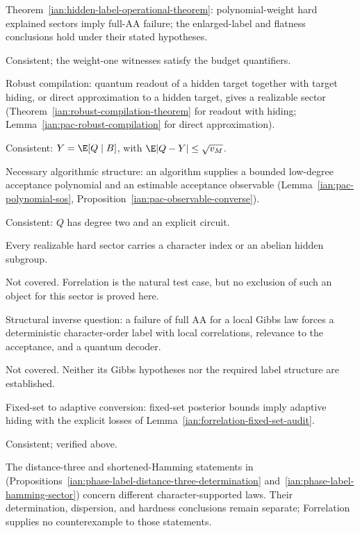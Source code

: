 \begin{remark}
\noindent
\parbox[t]{.70\linewidth}{Theorem~\ref{ian:hidden-label-operational-theorem}: polynomial-weight hard explained sectors imply full-AA failure; the enlarged-label and flatness conclusions hold under their stated hypotheses.}
\hfill
\parbox[t]{.26\linewidth}{Consistent; the weight-one witnesses satisfy the budget quantifiers.}
\par\smallskip

\noindent
\parbox[t]{.70\linewidth}{Robust compilation: quantum readout of a hidden target together with target hiding, or direct approximation to a hidden target, gives a realizable sector (Theorem~\ref{ian:robust-compilation-theorem} for readout with hiding; Lemma~\ref{ian:pac-robust-compilation} for direct approximation).}
\hfill
\parbox[t]{.26\linewidth}{Consistent: \(Y=\E[Q\mid B]\), with \(\E|Q-Y|\le\sqrt{v_M}\).}
\par\smallskip

\noindent
\parbox[t]{.70\linewidth}{Necessary algorithmic structure: an algorithm supplies a bounded low-degree acceptance polynomial and an estimable acceptance observable (Lemma~\ref{ian:pac-polynomial-sos}, Proposition~\ref{ian:pac-observable-converse}).}
\hfill
\parbox[t]{.26\linewidth}{Consistent: \(Q\) has degree two and an explicit circuit.}
\par\smallskip

\noindent
\parbox[t]{.70\linewidth}{Every realizable hard sector carries a character index or an abelian hidden subgroup.}
\hfill
\parbox[t]{.26\linewidth}{Not covered. Forrelation is the natural test case, but no exclusion of such an object for this sector is proved here.}
\par\smallskip

\noindent
\parbox[t]{.70\linewidth}{Structural inverse question: a failure of full AA for a local Gibbs law forces a deterministic character-order label with local correlations, relevance to the acceptance, and a quantum decoder.}
\hfill
\parbox[t]{.26\linewidth}{Not covered. Neither its Gibbs hypotheses nor the required label structure are established.}
\par\smallskip

\noindent
\parbox[t]{.70\linewidth}{Fixed-set to adaptive conversion: fixed-set posterior bounds imply adaptive hiding with the explicit losses of Lemma~\ref{ian:forrelation-fixed-set-audit}.}
\hfill
\parbox[t]{.26\linewidth}{Consistent; verified above.}
\par\smallskip

The distance-three and shortened-Hamming statements in
 (Propositions~\ref{ian:phase-label-distance-three-determination} and~\ref{ian:phase-label-hamming-sector}) concern different character-supported laws. Their determination, dispersion, and hardness conclusions remain separate; Forrelation supplies no counterexample to those statements.
\end{remark}

